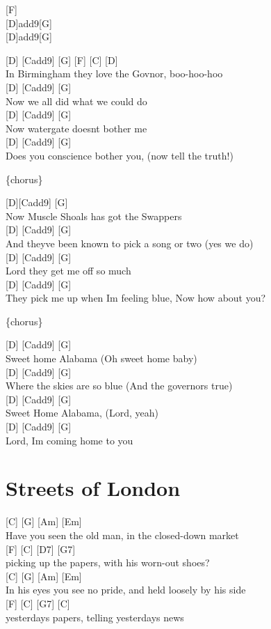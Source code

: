 \documentclass[
  letterpaper,
]{scrbook}
\begin{document}
{[}F{]}\\
{[}D{]}add9{[}G{]}\\
{[}D{]}add9{[}G{]}

{[}D{]} {[}Cadd9{]} {[}G{]} {[}F{]} {[}C{]} {[}D{]}\\
In Birmingham they love the Gov\textquotesingle nor, boo-hoo-hoo\\
{[}D{]} {[}Cadd9{]} {[}G{]}\\
Now we all did what we could do\\
{[}D{]} {[}Cadd9{]} {[}G{]}\\
Now watergate doesn\textquotesingle t bother me\\
{[}D{]} {[}Cadd9{]} {[}G{]}\\
Does you conscience bother you, (now tell the truth!)

\{chorus\}

{[}D{]}{[}Cadd9{]} {[}G{]}\\
Now Muscle Shoals has got the Swappers\\
{[}D{]} {[}Cadd9{]} {[}G{]}\\
And they\textquotesingle ve been known to pick a song or two (yes we
do)\\
{[}D{]} {[}Cadd9{]} {[}G{]}\\
Lord they get me off so much\\
{[}D{]} {[}Cadd9{]} {[}G{]}\\
They pick me up when I\textquotesingle m feeling blue, Now how about
you?

\{chorus\}

{[}D{]} {[}Cadd9{]} {[}G{]}\\
Sweet home Alabama (Oh sweet home baby)\\
{[}D{]} {[}Cadd9{]} {[}G{]}\\
Where the skies are so blue (And the governor\textquotesingle s true)\\
{[}D{]} {[}Cadd9{]} {[}G{]}\\
Sweet Home Alabama, (Lord, yeah)\\
{[}D{]} {[}Cadd9{]} {[}G{]}\\
Lord, I\textquotesingle m coming home to you

\hypertarget{streets-of-london}{%
\chapter{Streets of London}\label{streets-of-london}}

{[}C{]} {[}G{]} {[}Am{]} {[}Em{]}\\
Have you seen the old man, in the closed-down market\\
{[}F{]} {[}C{]} {[}D7{]} {[}G7{]}\\
picking up the papers, with his worn-out shoes?\\
{[}C{]} {[}G{]} {[}Am{]} {[}Em{]}\\
In his eyes you see no pride, and held loosely by his side\\
{[}F{]} {[}C{]} {[}G7{]} {[}C{]}\\
yesterday\textquotesingle s papers, telling yesterday\textquotesingle s
news
\end{document}
